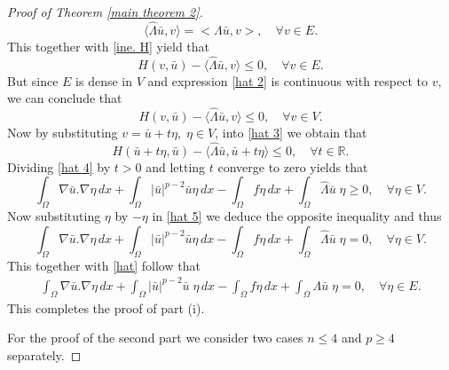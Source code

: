 \documentclass[reqno]{amsart}
\begin{document}
\begin{proof}[Proof of Theorem \ref{main theorem 2}]
\begin{equation}
\langle \hat{\Lambda} \bar{u},v\rangle=<\Lambda \bar{u},v>,\quad  \forall v\in E.
\end{equation}
This together with \eqref{ine. H} yield that
\begin{equation}\label{hat 2}
H(v, \bar{u}) -\langle \hat{\Lambda} \bar{u},v\rangle \leq 0 ,\quad  \forall v\in E.
\end{equation}
But since \(E\) is dense in \(V\) and  expression \eqref{hat 2} is continuous with
respect to \(v\), we can conclude that
\begin{equation}\label{hat 3}
H(v, \bar{u}) -\langle \hat{\Lambda} \bar{u},v\rangle \leq 0 ,\quad  \forall v\in V.
\end{equation}
Now by substituting \(v=\bar{u}+t\eta,\;\eta \in V\), into \eqref{hat 3}  we obtain that
\begin{equation}\label{hat 4}
H(\bar{u}+t\eta, \bar{u}) -\langle \hat{\Lambda} \bar{u},\bar{u}+t\eta\rangle
\leq 0 ,\quad  \forall t \in \mathbb{R}.
\end{equation}
Dividing \eqref{hat 4} by  \(t>0\) and letting \(t\) converge to zero yields that
\begin{equation} \label{hat 5}
  \int_\Omega\nabla \bar{u}.\nabla\eta\,dx + \int_\Omega |\bar{u}|^{p-2}\bar{u} \eta \,dx
   -\int_\Omega f\eta\,dx + \int_\Omega \hat{\Lambda} \bar{u}\;\eta \geq 0,\quad
   \forall\eta\in  V.
\end{equation}
Now substituting \(\eta\) by \(-\eta\)  in \eqref{hat 5} we deduce the opposite
inequality and thus
\begin{equation} \label{hat 6}
  \int_\Omega\nabla \bar{u}.\nabla\eta\,dx
  + \int_\Omega |\bar{u}|^{p-2}\bar{u} \eta \,dx
  -\int_\Omega f\eta\,dx + \int_\Omega \hat{\Lambda} \bar{u}\;\eta = 0,
  \quad \forall\eta\in  V.
\end{equation}
This together with \eqref{hat} follow that
\begin{align*} %
  \int_\Omega\nabla \bar{u}.\nabla\eta\,dx
  + \int_\Omega |\bar{u}|^{p-2}\bar{u}\; \eta \,dx
  -\int_\Omega f\eta\,dx + \int_\Omega {\Lambda} \bar{u}\;\eta = 0,\quad
  \forall\eta\in  E.
\end{align*}
This completes the proof of part (i).

For the proof of the second part  we consider two cases \(n\leq 4\) and \(p\geq 4\)
separately.
\smallskip


\end{proof}
\end{document}
